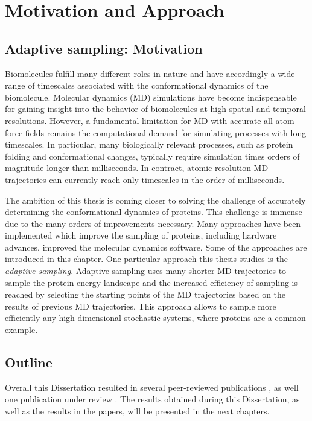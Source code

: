 \chapter{Motivation and Approach}

\section{Adaptive sampling: Motivation}
Biomolecules fulfill many different roles in nature and have accordingly a wide range of timescales associated with the conformational dynamics of the biomolecule. Molecular dynamics (MD) simulations have become indispensable for gaining
insight into the behavior of biomolecules at high spatial and temporal resolutions.
However, a fundamental limitation for MD with accurate all-atom force-fields remains
the computational demand for simulating processes with long timescales. In
particular, many biologically relevant processes, such as protein folding and
conformational changes, typically require simulation times orders of magnitude longer than
milliseconds. In contract, atomic-resolution MD trajectories can currently reach only 
timescales in the order of milliseconds. 

The ambition of this thesis is coming closer to solving the challenge of accurately determining the conformational dynamics of proteins. This challenge is immense due to the many orders of improvements necessary. Many approaches have been implemented which improve the sampling of proteins, including hardware advances, improved the molecular dynamics software. Some of the approaches are introduced in this chapter. One particular approach this thesis studies is the \emph{adaptive sampling}. Adaptive sampling uses many shorter MD trajectories to sample the protein energy landscape and the increased efficiency of sampling is reached by selecting the starting points of the MD trajectories based on the results of previous MD trajectories. This approach allows to sample more efficiently any high-dimensional stochastic systems, where proteins are a common example.

\section{Outline}
 
Overall this Dissertation resulted in several peer-reviewed publications \cite{Adstrategies2018, Extasy2016}, as well one publication under review \cite{Extasy2019}. The results obtained during this Dissertation, as well as the results in the papers, will be presented in the next chapters.
 
